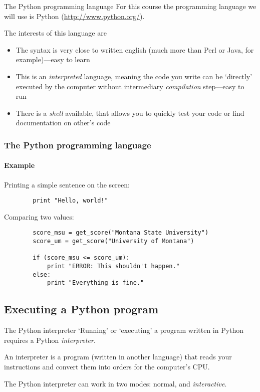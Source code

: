 \documentclass[handout]{beamer}
\begin{document}
\begin{frame}{The Python programming language}
	For this course the programming language we will use is Python (\url{http://www.python.org/}).

	\pause
	\bigskip
	The interests of this language are
	\begin{itemize}
		\item The syntax is very close to written english (much more than Perl or Java, for example)---easy to learn
		\pause
		\item This is an \textit{interpreted} language, meaning the code you write can be `directly' executed by the computer without intermediary \textit{compilation} step---easy to run
		\pause
		\item There is a \textit{shell} available, that allows you to quickly test your code or find documentation on other's code
	\end{itemize}
\end{frame}

\begin{frame}[fragile]
	\frametitle{The Python programming language}
	\framesubtitle{Example}
	Printing a simple sentence on the screen:
	\begin{verbatim}
		print "Hello, world!"
	\end{verbatim}

	\pause
	Comparing two values:
	\begin{verbatim}
		score_msu = get_score("Montana State University")
		score_um = get_score("University of Montana")

		if (score_msu <= score_um):
		    print "ERROR: This shouldn't happen."
		else:
		    print "Everything is fine."
	\end{verbatim}
\end{frame}

\subsection{Executing a Python program}

\begin{frame}{The Python interpreter}
	`Running' or `executing' a program written in Python requires a Python \textit{interpreter}.

	\bigskip
	An interpreter is a program (written in another language) that reads your instructions and convert them into orders for the computer's CPU.

	\pause
	\bigskip
	The Python interpreter can work in two modes: normal, and \textit{interactive}.
\end{frame}
\end{document}
